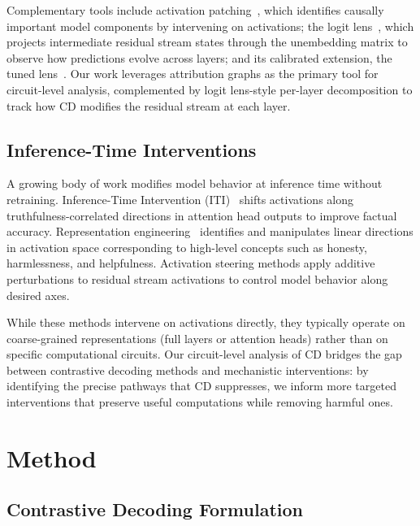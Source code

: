 \documentclass[11pt]{article}
\begin{document}
Complementary tools include activation patching~\citep{conmy2023automated}, which identifies causally important model components by intervening on activations; the logit lens~\citep{nostalgebraist2020logitlens}, which projects intermediate residual stream states through the unembedding matrix to observe how predictions evolve across layers; and its calibrated extension, the tuned lens~\citep{belrose2023tuned}. Our work leverages attribution graphs as the primary tool for circuit-level analysis, complemented by logit lens-style per-layer decomposition to track how CD modifies the residual stream at each layer.

\subsection{Inference-Time Interventions}

A growing body of work modifies model behavior at inference time without retraining. Inference-Time Intervention (ITI)~\citep{li2024iti} shifts activations along truthfulness-correlated directions in attention head outputs to improve factual accuracy. Representation engineering~\citep{zou2023representation} identifies and manipulates linear directions in activation space corresponding to high-level concepts such as honesty, harmlessness, and helpfulness. Activation steering methods apply additive perturbations to residual stream activations to control model behavior along desired axes.

While these methods intervene on activations directly, they typically operate on coarse-grained representations (full layers or attention heads) rather than on specific computational circuits. Our circuit-level analysis of CD bridges the gap between contrastive decoding methods and mechanistic interventions: by identifying the precise pathways that CD suppresses, we inform more targeted interventions that preserve useful computations while removing harmful ones.

\section{Method}
\label{sec:method}

\subsection{Contrastive Decoding Formulation}
\label{sec:cd-formulation}
\end{document}
